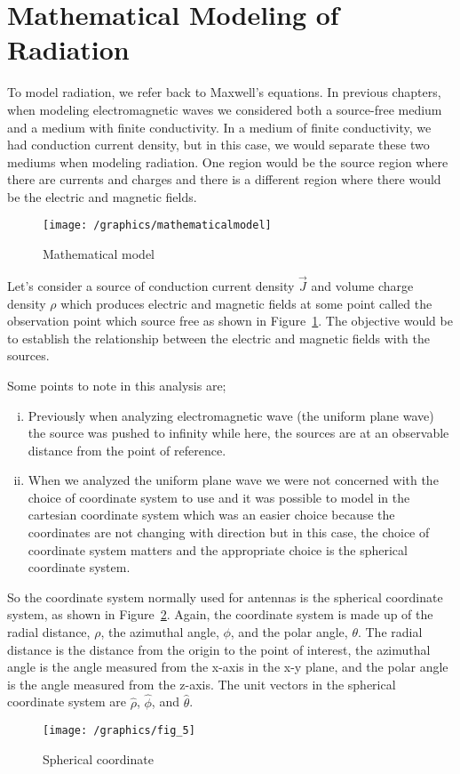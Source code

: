 \section{Mathematical Modeling of Radiation}
To model radiation, we refer back to Maxwell's equations. In previous chapters, when modeling electromagnetic waves we considered both a source-free medium and a medium with finite conductivity. In a medium of finite conductivity, we had conduction current density, but in this case, we would separate these two mediums when modeling radiation. One region would be the source region where there are currents and charges and there is a different region where there would be the electric and magnetic fields.
\begin{figure}[h]
\centering
\texttt{[image: /graphics/mathematicalmodel]}
\caption{Mathematical model}
\label{fig:mathematicalmodel}
\end{figure}

Let's consider a source of conduction current density $\vec{J}$ and volume charge density $\rho$ which produces electric and magnetic fields at some point called the observation point which source free as shown in Figure~\ref{fig:mathematicalmodel}. The objective would be to establish the relationship between the electric and magnetic fields with the sources.

Some points to note in this analysis are;
\begin{enumerate}[(i)]
\item Previously when analyzing electromagnetic wave (the uniform plane wave) the source was pushed to infinity while here, the sources are at an observable distance from the point of reference.
\item When we analyzed the uniform plane wave we were not concerned with the choice of coordinate system to use and it was possible to model in the cartesian coordinate system which was an easier choice because the coordinates are not changing with direction but in this case, the choice of coordinate system matters and the appropriate choice is the spherical coordinate system.
\end{enumerate}

So the coordinate system normally used for antennas is the spherical coordinate system, as shown in Figure~\ref{fig:sphericalcoordinate}. Again, the coordinate system is made up of the radial distance, $\rho$, the azimuthal angle, $\phi$, and the polar angle, $\theta$. The radial distance is the distance from the origin to the point of interest, the azimuthal angle is the angle measured from the x-axis in the x-y plane, and the polar angle is the angle measured from the z-axis. The unit vectors in the spherical coordinate system are $\hat{\rho}$, $\hat{\phi}$, and $\hat{\theta}$.
\begin{figure}[h]
\centering
\texttt{[image: /graphics/fig\_5]}
\caption{Spherical coordinate}
\label{fig:sphericalcoordinate}
\end{figure}

